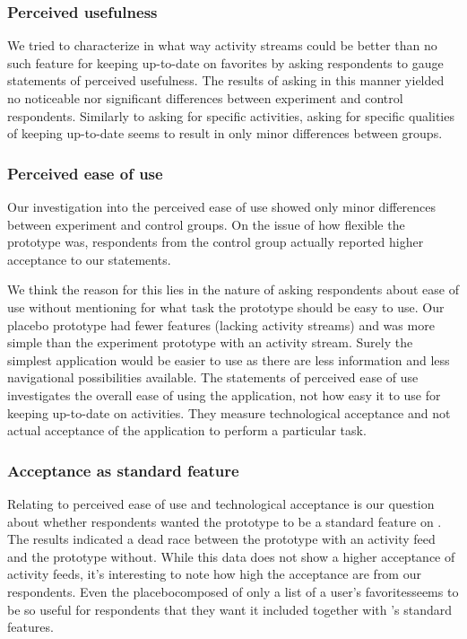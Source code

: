\subsubsection{Perceived usefulness}

We tried to characterize in what way activity streams could be better than
no such feature for keeping up-to-date on favorites by asking respondents
to gauge statements of perceived usefulness.%
The results of asking in this manner yielded no noticeable nor significant
differences between experiment and control respondents. Similarly to asking
for specific activities, asking for specific qualities of keeping up-to-date
seems to result in only minor differences between groups.

\subsubsection{Perceived ease of use}

Our investigation into the perceived ease of use%
showed only minor differences between experiment and control groups. On the
issue of how flexible the prototype was, respondents from the control group
actually reported higher acceptance to our statements.

We think the reason for
this lies in the nature of asking respondents about ease of use without
mentioning for what task the prototype should be easy to use. Our placebo
prototype had fewer features (lacking activity streams) and was more simple
than the experiment prototype with an activity stream. Surely the simplest
application would be easier to use as there are less information and less
navigational possibilities available. The statements of perceived ease of use
investigates the overall ease of using the application, not how easy it to use
for keeping up-to-date on activities. They measure technological acceptance
and not actual acceptance of the application to perform a particular task.

\subsubsection{Acceptance as standard feature}

Relating to perceived ease of use and technological acceptance is our question
about whether respondents wanted the prototype to be a standard feature
on \urort{}. The results%
indicated a dead race between the prototype with an activity feed and the
prototype without. While this data does not show a higher acceptance of
activity feeds, it's interesting to note how high the acceptance are from
our respondents. Even the placebo\dash{}composed of only a list of
a user's favorites\dash{}seems to be so useful for respondents that they want
it included together with \urort{}'s standard features.

